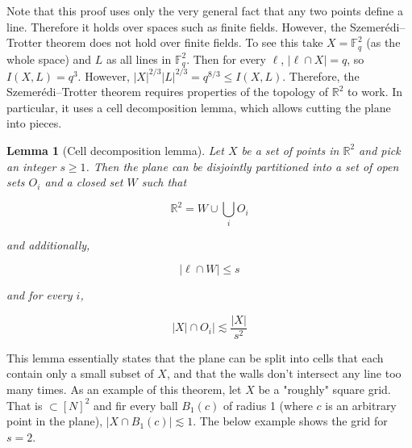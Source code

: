 \documentclass[12pt]{amsart}
\newtheorem{lemma}[theorem]{Lemma}
\begin{document}
Note that this proof uses only the very general fact that any two points define a line. Therefore it holds over spaces such as finite fields. However, the Szemerédi–Trotter theorem does not hold over finite fields. To see this take $X = \mathbb{F}_q^2$ (as the whole space) and $L$ as all lines in $\mathbb{F}_q^2$. Then for every $\ell$, $|\ell \cap X| = q$, so $I(X,L) = q^3$. However, $|X|^{2/3} |L|^{2/3} = q^{8/3} \leq I(X,L)$. Therefore, the Szemerédi–Trotter theorem requires properties of the topology of $\mathbb{R}^2$ to work. In particular, it uses a cell decomposition lemma, which allows cutting the plane into pieces. 

\begin{lemma}[Cell decomposition lemma]
Let $X$ be a set of points in $\mathbb{R}^2$ and pick an integer $s\geq 1$. Then the plane can be disjointly partitioned into a set of open sets $O_i$ and a closed set $W$ such that 

\[\mathbb{R}^2 = W \cup \bigcup_i O_i\] 

and additionally, 

\[|\ell \cap W| \leq s\] 

and for every $i$, 

\[|X| \cap O_i| \lesssim \frac{|X|}{s^2} \]
\end{lemma}

This lemma essentially states that the plane can be split into cells that each contain only a small subset of $X$, and that the walls don't intersect any line too many times. As an example of this theorem, let $X$ be a "roughly" square grid. That is $\subset [N]^2$ and fir every ball $B_1(c)$ of radius 1 (where $c$ is an arbitrary point in the plane), $|X\cap B_1(c)| \lesssim 1$. The below example shows the grid for $s = 2$. 
\end{document}
